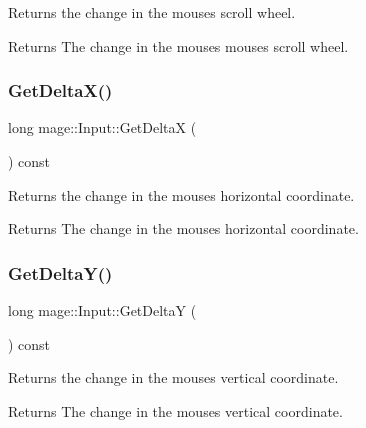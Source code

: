 Returns the change in the mouse\textquotesingle{}s scroll wheel.

\begin{DoxyReturn}{Returns}
The change in the mouse\textquotesingle{}s mouse\textquotesingle{}s scroll wheel. 
\end{DoxyReturn}
\hypertarget{classmage_1_1_input_a6fcfe61fc9f5a2575375c7e2c39507f5}{}\label{classmage_1_1_input_a6fcfe61fc9f5a2575375c7e2c39507f5} 
\subsubsection{\texorpdfstring{Get\+Delta\+X()}{GetDeltaX()}}
{\footnotesize\ttfamily long mage\+::\+Input\+::\+Get\+DeltaX (\begin{DoxyParamCaption}{ }\end{DoxyParamCaption}) const}

Returns the change in the mouse\textquotesingle{}s horizontal coordinate.

\begin{DoxyReturn}{Returns}
The change in the mouse\textquotesingle{}s horizontal coordinate. 
\end{DoxyReturn}
\hypertarget{classmage_1_1_input_ac63b55db4438989d2c6729a358ace296}{}\label{classmage_1_1_input_ac63b55db4438989d2c6729a358ace296} 
\subsubsection{\texorpdfstring{Get\+Delta\+Y()}{GetDeltaY()}}
{\footnotesize\ttfamily long mage\+::\+Input\+::\+Get\+DeltaY (\begin{DoxyParamCaption}{ }\end{DoxyParamCaption}) const}

Returns the change in the mouse\textquotesingle{}s vertical coordinate.

\begin{DoxyReturn}{Returns}
The change in the mouse\textquotesingle{}s vertical coordinate. 
\end{DoxyReturn}
\hypertarget{classmage_1_1_input_aed069ebf04f32b924a9f1d5a1371f69a}{}\label{classmage_1_1_input_aed069ebf04f32b924a9f1d5a1371f69a} 
